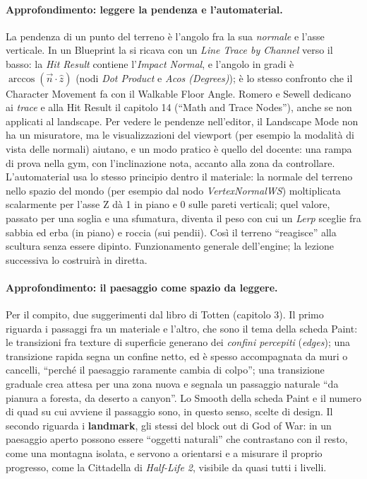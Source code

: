 \paragraph{Approfondimento: leggere la pendenza e l'automaterial.} La pendenza di un punto
del terreno è l'angolo fra la sua \emph{normale} e l'asse verticale. In un Blueprint la si
ricava con un \emph{Line Trace by Channel} verso il basso: la \emph{Hit Result} contiene
l'\emph{Impact Normal}, e l'angolo in gradi è $\arccos(\vec{n}\cdot\hat{z})$ (nodi
\emph{Dot Product} e \emph{Acos (Degrees)}); è lo stesso confronto che il Character Movement
fa con il Walkable Floor Angle. Romero e Sewell dedicano ai \emph{trace} e alla Hit Result il
capitolo 14 (``Math and Trace Nodes''), anche se non applicati al landscape. Per vedere le
pendenze nell'editor, il Landscape Mode non ha un misuratore, ma le visualizzazioni del
viewport (per esempio la modalità di vista delle normali) aiutano, e un modo pratico è
quello del docente: una rampa di prova nella gym, con l'inclinazione nota, accanto alla
zona da controllare. L'automaterial usa lo stesso principio dentro il materiale: la
normale del terreno nello spazio del mondo (per esempio dal nodo \emph{VertexNormalWS})
moltiplicata scalarmente per l'asse Z dà 1 in piano e 0 sulle pareti verticali; quel valore,
passato per una soglia e una sfumatura, diventa il peso con cui un \emph{Lerp} sceglie fra
sabbia ed erba (in piano) e roccia (sui pendii). Così il terreno ``reagisce'' alla scultura
senza essere dipinto. Funzionamento generale dell'engine; la lezione successiva lo
costruirà in diretta.

\paragraph{Approfondimento: il paesaggio come spazio da leggere.} Per il compito, due
suggerimenti dal libro di Totten (capitolo 3). Il primo riguarda i passaggi fra un
materiale e l'altro, che sono il tema della scheda Paint: le transizioni fra texture di
superficie generano dei \emph{confini percepiti} (\emph{edges}); una transizione rapida
segna un confine netto, ed è spesso accompagnata da muri o cancelli, ``perché il paesaggio
raramente cambia di colpo''; una transizione graduale crea attesa per una zona nuova e
segnala un passaggio naturale ``da pianura a foresta, da deserto a canyon''. Lo Smooth della
scheda Paint e il numero di quad su cui avviene il passaggio sono, in questo senso, scelte di
design. Il secondo riguarda i \textbf{landmark}, gli stessi del block out di God of War: in
un paesaggio aperto possono essere ``oggetti naturali'' che contrastano con il resto, come
una montagna isolata, e servono a orientarsi e a misurare il proprio progresso, come la
Cittadella di \emph{Half-Life 2}, visibile da quasi tutti i livelli.

